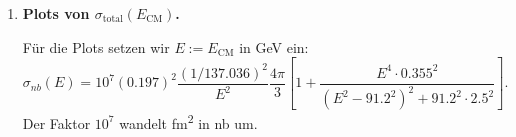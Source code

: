 \documentclass[11pt,a4paper]{scrartcl}
\newcommand{\paren}[1]{\left( #1 \right)}
\newcommand{\bracket}[1]{\left[ #1 \right]}
\theoremstyle{definition}
\theoremstyle{plain}
\theoremstyle{remark}
\begin{document}
\begin{enumerate}[label=(\alph*)]
    \begin{calculationbox}
        Am Maximum verwenden wir
        \[
            G(s)=1+167.7=168.7,
            \qquad
            s=(\SI{91.2}{GeV})^2=\SI{8317.44}{GeV^2}.
        \]
        Mit $\hbar c=\SI{0.197}{GeV.fm}$ und $\alpha=1/137.036$ ergibt sich
        \[
        \begin{aligned}
            \sigma_{\mathrm{total}}
            &=(0.197)^2\,\si{fm^2}\frac{(1/137.036)^2}{8317.44}\cdot168.7\cdot\frac{4\pi}{3}\\
            &=1.756\cdot10^{-7}\,\si{fm^2}.
        \end{aligned}
        \]
        Wegen
        \[
            \SI{1}{fm^2}=10^7\,\si{nb}
        \]
        folgt
        \[
            \sigma_{\mathrm{total}}=1.756\cdot10^{-7}\cdot10^7\,\si{nb}=\SI{1.756}{nb}.
        \]
        Ein Kreis gleicher Fläche erfüllt
        \[
            \sigma_{\mathrm{total}}=\pi r^2.
        \]
        Also
        \[
            r=\sqrt{\frac{\sigma_{\mathrm{total}}}{\pi}}
            =\sqrt{\frac{1.756\cdot10^{-7}\,\si{fm^2}}{\pi}}
            =2.36\cdot10^{-4}\,\si{fm}.
        \]
        In Metern ist
        \[
            r=2.36\cdot10^{-19}\,\si{m}.
        \]
    \end{calculationbox}

    \begin{answerbox}
        Am Resonanzmaximum ergibt sich
        \[
            \boxed{\sigma_{\mathrm{total}}=\SI{1.76}{nb}}.
        \]
        Ein Kreis mit gleicher Fläche hätte den Radius
        \[
            \boxed{r=2.36\cdot10^{-4}\,\si{fm}=2.36\cdot10^{-19}\,\si{m}}.
        \]
    \end{answerbox}

    \item \textbf{Plots von $\sigma_{\mathrm{total}}(E_{\mathrm{CM}})$.}

    \begin{formulabox}
        Für die Plots setzen wir $E:=E_{\mathrm{CM}}$ in \si{GeV} ein:
        \[
            \sigma_{\si{nb}}(E)
            =10^7(0.197)^2\frac{(1/137.036)^2}{E^2}\frac{4\pi}{3}
            \bracket{1+\frac{E^4\cdot0.355^2}{\paren{E^2-91.2^2}^2+91.2^2\cdot2.5^2}}.
        \]
        Der Faktor $10^7$ wandelt \si{fm^2} in \si{nb} um.
    \end{formulabox}


\end{enumerate}
\end{document}
